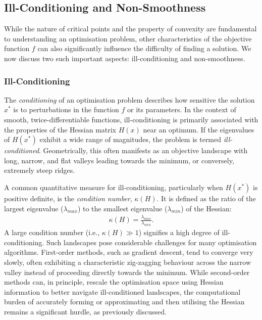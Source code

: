 \subsection{Ill-Conditioning and Non-Smoothness}
\label{ssec:ill_conditioning_nonsmooth}

While the nature of critical points and the property of convexity are fundamental to understanding an optimisation problem, other characteristics of the objective function $f$ can also significantly influence the difficulty of finding a solution. We now discuss two such important aspects: ill-conditioning and non-smoothness.

\subsubsection{Ill-Conditioning}
\label{sssec:ill_conditioning}

The \textit{conditioning} of an optimisation problem describes how sensitive the solution $x^*$ is to perturbations in the function $f$ or its parameters. In the context of smooth, twice-differentiable functions, ill-conditioning is primarily associated with the properties of the Hessian matrix $H(x)$ near an optimum. If the eigenvalues of $H(x^*)$ exhibit a wide range of magnitudes, the problem is termed \textit{ill-conditioned}. Geometrically, this often manifests as an objective landscape with long, narrow, and flat valleys leading towards the minimum, or conversely, extremely steep ridges.

A common quantitative measure for ill-conditioning, particularly when $H(x^*)$ is positive definite, is the \textit{condition number}, $\kappa(H)$. It is defined as the ratio of the largest eigenvalue ($\lambda_{max}$) to the smallest eigenvalue ($\lambda_{min}$) of the Hessian:
\begin{align}
    \kappa(H) = \frac{\lambda_{max}}{\lambda_{min}}.
    \label{eq:condition_number}
\end{align}
A large condition number (i.e., $\kappa(H) \gg 1$) signifies a high degree of ill-conditioning. Such landscapes pose considerable challenges for many optimisation algorithms. First-order methods, such as gradient descent, tend to converge very slowly, often exhibiting a characteristic zig-zagging behaviour across the narrow valley instead of proceeding directly towards the minimum. While second-order methods can, in principle, rescale the optimisation space using Hessian information to better navigate ill-conditioned landscapes, the computational burden of accurately forming or approximating and then utilising the Hessian remains a significant hurdle, as previously discussed.


